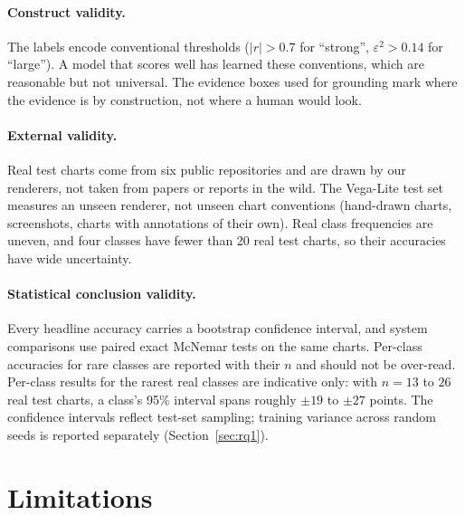 \paragraph{Construct validity.} The labels encode conventional thresholds
($|r|>0.7$ for ``strong'', $\varepsilon^2>0.14$ for ``large''). A model that scores well
has learned these conventions, which are reasonable but not universal. The evidence
boxes used for grounding mark where the evidence is by construction, not where a human
would look.

\paragraph{External validity.} Real test charts come from six public repositories and
are drawn by our renderers, not taken from papers or reports in the wild. The Vega-Lite
test set measures an unseen renderer, not unseen chart conventions (hand-drawn charts,
screenshots, charts with annotations of their own). Real class frequencies are uneven,
and four classes have fewer than 20 real test charts, so their accuracies have wide
uncertainty.

\paragraph{Statistical conclusion validity.} Every headline accuracy carries a bootstrap
confidence interval, and system comparisons use paired exact McNemar tests on the same
charts. Per-class accuracies for rare classes are reported with their $n$ and should not
be over-read. Per-class results for the rarest real classes are indicative only: with $n=13$ to $26$ real test charts, a class's 95\% interval spans roughly $\pm 19$ to $\pm 27$ points. The confidence intervals reflect test-set sampling; training variance across random seeds is
reported separately (Section~\ref{sec:rq1}).

\section{Limitations}

